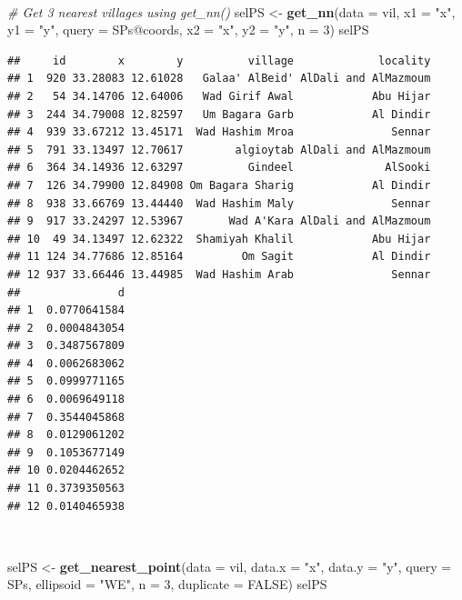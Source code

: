 \documentclass[11pt,a4paper]{article}
\newenvironment{Shaded}{}{}
\newcommand{\KeywordTok}[1]{\textcolor[rgb]{0.00,0.44,0.13}{\textbf{#1}}}
\newcommand{\DataTypeTok}[1]{\textcolor[rgb]{0.56,0.13,0.00}{#1}}
\newcommand{\DecValTok}[1]{\textcolor[rgb]{0.25,0.63,0.44}{#1}}
\newcommand{\StringTok}[1]{\textcolor[rgb]{0.25,0.44,0.63}{#1}}
\newcommand{\CommentTok}[1]{\textcolor[rgb]{0.38,0.63,0.69}{\textit{#1}}}
\newcommand{\OtherTok}[1]{\textcolor[rgb]{0.00,0.44,0.13}{#1}}
\newcommand{\OperatorTok}[1]{\textcolor[rgb]{0.40,0.40,0.40}{#1}}
\newcommand{\NormalTok}[1]{#1}
\begin{document}
~

\begin{Shaded}
\begin{Highlighting}[]
\CommentTok{# Get 3 nearest villages using get_nn()}
\NormalTok{selPS <-}\StringTok{ }\KeywordTok{get_nn}\NormalTok{(}\DataTypeTok{data =}\NormalTok{ vil, }\DataTypeTok{x1 =} \StringTok{"x"}\NormalTok{, }\DataTypeTok{y1 =} \StringTok{"y"}\NormalTok{, }
                \DataTypeTok{query =}\NormalTok{ SPs}\OperatorTok{@}\NormalTok{coords, }\DataTypeTok{x2 =} \StringTok{"x"}\NormalTok{, }\DataTypeTok{y2 =} \StringTok{"y"}\NormalTok{, }
                \DataTypeTok{n =} \DecValTok{3}\NormalTok{)}
\NormalTok{selPS}
\end{Highlighting}
\end{Shaded}

\begin{verbatim}
##     id        x        y          village             locality
## 1  920 33.28083 12.61028   Galaa' AlBeid' AlDali and AlMazmoum
## 2   54 34.14706 12.64006   Wad Girif Awal            Abu Hijar
## 3  244 34.79008 12.82597   Um Bagara Garb            Al Dindir
## 4  939 33.67212 13.45171  Wad Hashim Mroa               Sennar
## 5  791 33.13497 12.70617        algioytab AlDali and AlMazmoum
## 6  364 34.14936 12.63297          Gindeel              AlSooki
## 7  126 34.79900 12.84908 Om Bagara Sharig            Al Dindir
## 8  938 33.66769 13.44440  Wad Hashim Maly               Sennar
## 9  917 33.24297 12.53967       Wad A'Kara AlDali and AlMazmoum
## 10  49 34.13497 12.62322  Shamiyah Khalil            Abu Hijar
## 11 124 34.77686 12.85164         Om Sagit            Al Dindir
## 12 937 33.66446 13.44985  Wad Hashim Arab               Sennar
##               d
## 1  0.0770641584
## 2  0.0004843054
## 3  0.3487567809
## 4  0.0062683062
## 5  0.0999771165
## 6  0.0069649118
## 7  0.3544045868
## 8  0.0129061202
## 9  0.1053677149
## 10 0.0204462652
## 11 0.3739350563
## 12 0.0140465938
\end{verbatim}

~

\begin{Shaded}
\begin{Highlighting}[]
\NormalTok{selPS <-}\StringTok{ }\KeywordTok{get_nearest_point}\NormalTok{(}\DataTypeTok{data =}\NormalTok{ vil, }\DataTypeTok{data.x =} \StringTok{"x"}\NormalTok{, }\DataTypeTok{data.y =} \StringTok{"y"}\NormalTok{, }
                           \DataTypeTok{query =}\NormalTok{ SPs, }\DataTypeTok{ellipsoid =} \StringTok{"WE"}\NormalTok{,}
                           \DataTypeTok{n =} \DecValTok{3}\NormalTok{, }\DataTypeTok{duplicate =} \OtherTok{FALSE}\NormalTok{)}
\NormalTok{selPS}
\end{Highlighting}
\end{Shaded}
\end{document}
